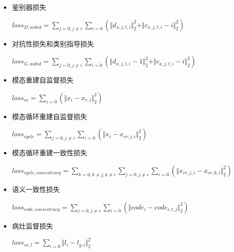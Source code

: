 \documentclass[letterpaper]{article} %
\begin{document}
\begin{itemize}
	\item 鉴别器损失
	
	\begin{center}
		$loss_{D,aided}=\sum\limits_{j=0,j\neq i}\sum\limits_{i=0}(\Vert{d_{x,j,t,i}}\Vert_{2}^{2}+\Vert{c_{x,j,t,i}-i}\Vert_{2}^{2})$
	\end{center}
	
	\item 对抗性损失和类别指导损失
	
	\begin{center}
		$loss_{G,aided}=\sum\limits_{j=0,j\neq i}\sum\limits_{i=0}(\Vert{d_{x,j,t,i}-1}\Vert_{2}^{2}+\Vert{c_{x,j,t,i}-i}\Vert_{2}^{2})$
	\end{center}
	
	\item 模态重建自监督损失
	
	\begin{center}
		$loss_{sv}=\sum\limits_{i=0}(\Vert{x_i-x_{r,i}}\Vert_{2}^{2})$
	\end{center}
	
	\item 模态循环重建自监督损失
	
	\begin{center}
		$loss_{cycle}=\sum\limits_{j=0,j\neq i}\sum\limits_{i=0}(\Vert{x_i-x_{cr,j,i}}\Vert_{2}^{2})$
	\end{center}
	
	\item 模态循环重建一致性损失
	
	\begin{center}
		$loss_{cycle,consistency}=\sum\limits_{k=0,k\neq j,k\neq i}\sum\limits_{j=0,j\neq i}\sum\limits_{i=0}(\Vert{x_{cr,j,i}-x_{cr,k,i}}\Vert_{2}^{2})$
	\end{center}
	
	\item 语义一致性损失
	
	\begin{center}
		$loss_{code,consistency}=\sum\limits_{j=0,j\neq i}\sum\limits_{i=0}(\Vert{code_i-code_{i,t,j}}\Vert_{2}^{2})$
	\end{center}
	
	\item 病灶监督损失
	
	\begin{center}
		$loss_{sv,l}=\sum\limits_{i=0}\Vert{l_i-l_{g,i}}\Vert_{2}^{2}$
	\end{center}
	
\end{itemize}
\end{document}
